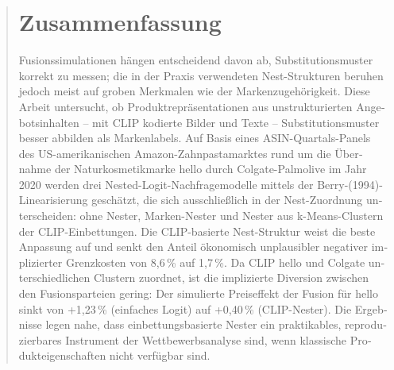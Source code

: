 \documentclass[a4paper,titlepage,liststotoc,final,twoside,openright,cleardoubleempty,BCOR12mm]{scrreprt}
\begin{document}
\begin{abstract}
\begin{otherlanguage}{ngerman}
\section*{Zusammenfassung}
Fusionssimulationen h\"angen entscheidend davon ab, Substitutionsmuster korrekt
zu messen; die in der Praxis verwendeten Nest-Strukturen beruhen jedoch meist
auf groben Merkmalen wie der Markenzugeh\"origkeit. Diese Arbeit untersucht, ob
Produktrepr\"asentationen aus unstrukturierten Angebotsinhalten -- mit CLIP
kodierte Bilder und Texte -- Substitutionsmuster besser abbilden als
Markenlabels. Auf Basis eines ASIN-Quartals-Panels des US-amerikanischen
Amazon-Zahnpastamarktes rund um die \"Ubernahme der Naturkosmetikmarke hello
durch Colgate-Palmolive im Jahr 2020 werden drei Nested-Logit-Nachfragemodelle
mittels der Berry-(1994)-Linearisierung gesch\"atzt, die sich ausschlie{\ss}lich
in der Nest-Zuordnung unterscheiden: ohne Nester, Marken-Nester und Nester aus
k-Means-Clustern der CLIP-Einbettungen. Die CLIP-basierte Nest-Struktur weist
die beste Anpassung auf und senkt den Anteil \"okonomisch unplausibler negativer
implizierter Grenzkosten von 8{,}6\,\% auf 1{,}7\,\%. Da CLIP hello und Colgate
unterschiedlichen Clustern zuordnet, ist die implizierte Diversion zwischen den
Fusionsparteien gering: Der simulierte Preiseffekt der Fusion f\"ur hello sinkt
von +1{,}23\,\% (einfaches Logit) auf +0{,}40\,\% (CLIP-Nester). Die Ergebnisse
legen nahe, dass einbettungsbasierte Nester ein praktikables, reproduzierbares
Instrument der Wettbewerbsanalyse sind, wenn klassische Produkteigenschaften
nicht verf\"ugbar sind.
\end{otherlanguage}
\end{abstract}

\tableofcontents
\listoffigures
\listoftables

\cleardoublepage
{} %


\end{document}
